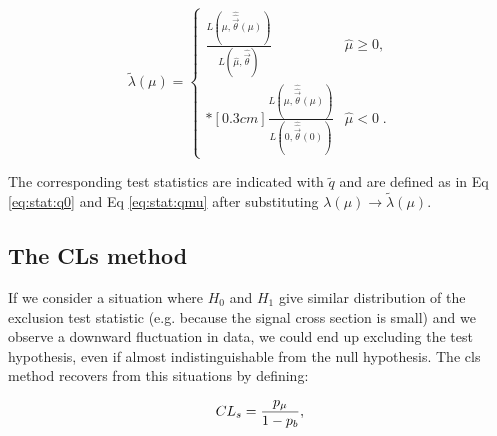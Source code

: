 \begin{equation}
\label{eq:stat:lik:alpexcl}
\tilde{\lambda}({\mu}) =
\left\{ \! \! \begin{array}{ll}
               \frac{ L(\mu,
               \hat{\hat{\vec{\theta}}}(\mu)) }
               {L(\hat{\mu}, \hat{\vec{\theta}}) }
                 & \hat{\mu} \ge 0 , \\*[0.3 cm]
                \frac{ L(\mu,
               \hat{\hat{\vec{\theta}}}(\mu)) }
               {L(0, \hat{\hat{\vec{\theta}}}(0)) }
 & \hat{\mu} < 0 \;.
              \end{array}
       \right.
\end{equation}

\noindent The corresponding test statistics are indicated with $\tilde{q}$ and are defined as in Eq \ref{eq:stat:q0} and Eq \ref{eq:stat:qmu} after substituting $\lambda({\mu}) \rightarrow \tilde{\lambda}({\mu})$.

\subsection{The CLs method}

If we consider a situation where $H_0$ and $H_1$ give similar distribution of the exclusion test statistic (e.g. because the signal cross section is
small) and we observe a downward fluctuation in data, we could end up excluding the test hypothesis, even if almost indistinguishable from the null hypothesis. The \gls{cls} method \cite{JUNK1999435} recovers from this situations by defining:

\begin{equation}
\label{eq:stat:cls}
CL_s = \dfrac{p_\mu}{1 - p_b} , 
\end{equation}

